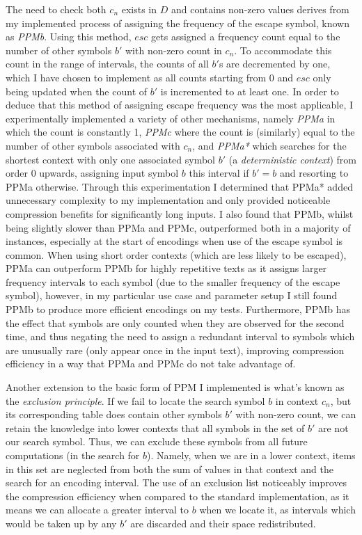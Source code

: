 \documentclass[a4paper, 11pt]{article}
\begin{document}
The need to check both $c_{n}$ exists in $D$ and contains non-zero values derives from my implemented process of assigning the frequency of the escape symbol, known as \emph{PPMb}. Using this method, $esc$ gets assigned a frequency count equal to the number of other symbols $b'$ with non-zero count in $c_{n}$. To accommodate this count in the range of intervals, the counts of all $b'$s are decremented by one, which I have chosen to implement as all counts starting from 0 and $esc$ only being updated when the count of $b'$ is incremented to at least one. In order to deduce that this method of assigning escape frequency was the most applicable, I experimentally implemented a variety of other mechanisms, namely \emph{PPMa} in which the count is constantly 1, \emph{PPMc} where the count is (similarly) equal to the number of other symbols associated with $c_{n}$, and \emph{PPMa*} which searches for the shortest context with only one associated symbol $b'$ (a \emph{deterministic context}) from order 0 upwards, assigning input symbol $b$ this interval if $b' = b$ and resorting to PPMa otherwise. Through this experimentation I determined that PPMa* added unnecessary complexity to my implementation and only provided noticeable compression benefits for significantly long inputs. I also found that PPMb, whilst being slightly slower than PPMa and PPMc, outperformed both in a majority of instances, especially at the start of encodings when use of the escape symbol is common. When using short order contexts (which are less likely to be escaped), PPMa can outperform PPMb for highly repetitive texts as it assigns larger frequency intervals to each symbol (due to the smaller frequency of the escape symbol), however, in my particular use case and parameter setup I still found PPMb to produce more efficient encodings on my tests. Furthermore, PPMb has the effect that symbols are only counted when they are observed for the second time, and thus negating the need to assign a redundant interval to symbols which are unusually rare (only appear once in the input text), improving compression efficiency in a way that PPMa and PPMc do not take advantage of.

Another extension to the basic form of PPM I implemented is what's known as the \emph{exclusion principle}. If we fail to locate the search symbol $b$ in context $c_{n}$, but its corresponding table does contain other symbols $b'$ with non-zero count, we can retain the knowledge into lower contexts that all symbols in the set of $b'$ are not our search symbol. Thus, we can exclude these symbols from all future computations (in the search for $b$). Namely, when we are in a lower context, items in this set are neglected from both the sum of values in that context and the search for an encoding interval. The use of an exclusion list noticeably improves the compression efficiency when compared to the standard implementation, as it means we can allocate a greater interval to $b$ when we locate it, as intervals which would be taken up by any $b'$ are discarded and their space redistributed.
\end{document}
